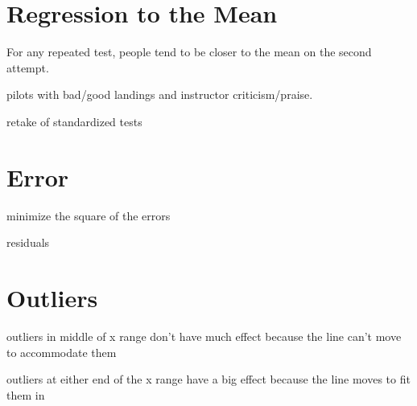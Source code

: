 \documentclass[landscape]{exam}
\begin{document}
  \section{Regression to the Mean}
  For any repeated test, people tend to be closer to the mean on the second attempt.

  \begin{itemize*}
    \item pilots with bad/good landings and instructor criticism/praise.
    \item retake of standardized tests
  \end{itemize*}

  \section{Error}

  \begin{itemize*}
    \item minimize the square of the errors
    \item residuals
  \end{itemize*}

  \section{Outliers}

  \begin{itemize*}
    \item outliers in middle of x range don't have much effect because the line can't
      move to accommodate them

    \item outliers at either end of the x range have a big effect because the line
      moves to fit them in
  \end{itemize*}
\end{document}
